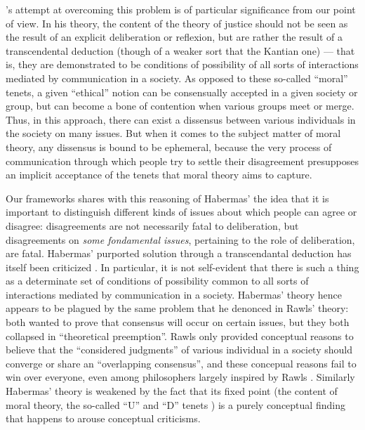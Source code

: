 \documentclass[version=3.21, pagesize, twoside=off, bibliography=totoc, DIV=calc, fontsize=12pt, a4paper, french, english]{scrartcl}
\begin{document}
\citeauthor{habermas_moralbewustsein_1983}'s \citeyearpar{habermas_moralbewustsein_1983} attempt at overcoming this problem is of particular significance from our point of view. 
In his theory, the content of the theory of justice should not be seen as the result of an explicit deliberation or reflexion, but are rather the result of a transcendental deduction (though of a weaker sort that the Kantian one) --- that is, they are demonstrated to be conditions of possibility of all sorts of interactions mediated by communication in a society. As opposed to these so-called “moral” tenets, a given “ethical” notion can be consensually accepted in a given society or group, but can become a bone of contention when various groups meet or merge. 
Thus, in this approach, there can exist a dissensus between various individuals in the society on many issues. 
But when it comes to the subject matter of moral theory, any dissensus is bound to be ephemeral, because the very process of communication through which people try to settle their disagreement presupposes an implicit acceptance of the tenets that moral theory aims to capture.

Our frameworks shares with this reasoning of Habermas' the idea that it is important to distinguish different kinds of issues about which people can agree or disagree: disagreements are not necessarily fatal to deliberation, but disagreements on \emph{some fondamental issues}, pertaining to the role of deliberation, are fatal. Habermas' purported solution through a transcendantal deduction has itself been criticized \citep{heath_communicative_2001}. 
In particular, it is not self-evident that there is such a thing as a determinate set of conditions of possibility common to all sorts of interactions mediated by communication in a society. 
Habermas' theory hence appears to be plagued by the same problem that he denonced in Rawls' theory: both wanted to prove that consensus will occur on certain issues, but they both collapsed in ``theoretical preemption''. Rawls only provided conceptual reasons to believe that the “considered judgments” of various individual in a society should converge or share an “overlapping consensus”, and these concepual reasons fail to win over everyone, even among philosophers largely inspired by Rawls \citep{estlund_insularity_1998, estlund_democratic_2009}. 
Similarly Habermas' theory is weakened by the fact that its fixed point (the content of moral theory, the so-called “U” and “D” tenets \citep{habermas_moralbewustsein_1983}) is a purely conceptual finding that happens to arouse conceptual criticisms.
\end{document}
